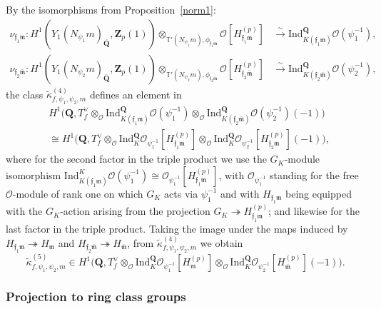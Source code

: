 \documentclass[10pt,letterpaper]{amsart}
\theoremstyle{plain}
\theoremstyle{definition}
\theoremstyle{definition}
\theoremstyle{plain}
\theoremstyle{plain}
\theoremstyle{plain}
\theoremstyle{remark}
\numberwithin{equation}{section}
\newcommand{\fkm}{\mathfrak{m}}
\newcommand{\fkmbar}{\overline{\mathfrak{m}}}
\newcommand{\fkf}{\mathfrak{f}}
\DeclareMathOperator{\et}{\acute{e}t}
\def\cO{\mathcal O}
\newcommand{\Q}{\mathbf{Q}}
\newcommand{\Z}{\mathbf{Z}}
\begin{document}
By the isomorphisms from Proposition~\ref{norm1}:
\begin{equation}\label{eq:CM-patching}
\begin{aligned}
\nu_{\fkf_1\fkm}:H^1_{\et}(Y_1(N_{\psi_1}m)_{\overline{\Q}},\Z_p(1))\otimes_{\mathbb{T}'(N_{\psi_1}m),\phi_{\fkf_1\fkm}}\mathcal{O}[H_{\mathfrak{f}_1\fkm}^{(p)}]&\xrightarrow{\sim}{\mathrm{Ind}}^{\Q}_{K(\fkf_1\fkm)}\mathcal{O}(\psi_{1}^{-1}),\\
\nu_{\fkf_2\fkmbar}:H^1_{\et}(Y_1(N_{\psi_2}m)_{\overline{\Q}},\Z_p(1))\otimes_{\mathbb{T}'(N_{\psi_2}m),\phi_{\fkf_2\fkmbar}}\mathcal{O}[H_{\mathfrak{f}_2\fkmbar}^{(p)}]&\xrightarrow{\sim}{\mathrm{Ind}}^{\Q}_{K(\fkf_2\fkmbar)}\mathcal{O}(\psi_{2}^{-1}),
\end{aligned}
\end{equation}
the class $\tilde{\kappa}_{f,\psi_1,\psi_2,m}^{(4)}$ defines an element in 
\begin{align*}
&H^1\bigl(\Q,T_f^{\vee}\otimes_{\mathcal{O}}\text{Ind}^{\Q}_{K(\fkf_1\fkm)}\mathcal{O}(\psi_1^{-1})\otimes_{\mathcal{O}}\text{Ind}^{\Q}_{K(\fkf_2\fkmbar)}\mathcal{O}(\psi_2^{-1})(-1)\bigr)\\
&\cong H^1\bigl(\Q,T_f^{\vee}\otimes_{\mathcal{O}}\text{Ind}^{\Q}_K\mathcal{O}_{\psi_1^{-1}}[H_{\fkf_1\fkm}^{(p)}]\otimes_{\mathcal{O}}\text{Ind}^{\Q}_{K}\mathcal{O}_{\psi_2^{-1}}[H_{\fkf_2\fkmbar}^{(p)}](-1)\bigr),
\end{align*}
where for the second factor in the triple product we use the $G_K$-module isomorphism ${\mathrm{Ind}}_{K(\fkf_1\fkm)}^K\cO(\psi_1^{-1})\cong\cO_{\psi_1^{-1}}[H_{\fkf_1\fkm}^{(p)}]$, with $\cO_{\psi_1^{-1}}$ standing for the free $\cO$-module of rank one on which $G_K$ acts via $\psi_1^{-1}$ and with $H_{\fkf_1\fkm}$ being equipped with the $G_K$-action arising from the projection $G_K\twoheadrightarrow H_{\fkf_1\fkm}^{(p)}$; and likewise for the last factor in the triple product. Taking the image under the maps induced by $
H_{\fkf_1\fkm}\twoheadrightarrow H_{\fkm}$ and $H_{\fkf_2\fkmbar}\twoheadrightarrow H_{\fkmbar}$, from  $\tilde{\kappa}_{f,\psi_1,\psi_2,m}^{(4)}$ we obtain 
\begin{equation}\label{eq:wrongclass-5}
\tilde{\kappa}_{f,\psi_1,\psi_2,m}^{(5)}\in H^1\bigl(\Q,T_f^{\vee}\otimes_{\mathcal{O}}{\mathrm{Ind}}^{\Q}_{K}\mathcal{O}_{\psi_1^{-1}}[H_{\fkm}^{(p)}]\otimes_{\mathcal{O}}{\mathrm{Ind}}^{\Q}_{K}\mathcal{O}_{\psi_2^{-1}}[H_{\fkmbar}^{(p)}](-1)\bigr).
\end{equation}


\subsubsection{Projection to ring class groups}
\end{document}
